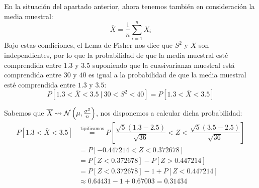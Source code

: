 \begin{ejercicio}
\begin{enumerate}[label=\alph*)]
            En la situación del apartado anterior, ahora tenemos también en consideración la media muestral:
            \begin{equation*}
                \overline{X} = \dfrac{1}{n}\sum_{i=1}^n X_i
            \end{equation*} 
            Bajo estas condiciones, el Lema de Fisher nos dice que $S^2$ y $\overline{X}$ son independientes, por lo que la probabilidad de que la media muestral esté comprendida entre $1.3$ y $3.5$ suponiendo que la cuasivarianza muestral está comprendida entre $30$ y $40$ es igual a la probabilidad de que la media muestral esté comprendida entre $1.3$ y $3.5$:
            \begin{equation*}
                P[1.3<\overline{X}<3.5\ |\ 30 < S^2 < 40] = P[1.3<\overline{X}<3.5]
            \end{equation*}

            Sabemos que $\overline{X}\rightsquigarrow\mathcal{N}\left(\mu, \frac{\sigma^2}{n}\right)$, nos disponemos a calcular dicha probabilidad:
            \begin{align*}
                P[1.3<\overline{X}<3.5] &\stackrel{\text{tipificamos}}{=} P\left[\dfrac{\sqrt{5}(1.3-2.5)}{\sqrt{36}}< Z < \dfrac{\sqrt{5}(3.5-2.5)}{\sqrt{36}}\right] \\
                                        &= P[-0.447214 < Z < 0.372678] \\ 
                                        &= P[Z<0.372678] - P[Z>0.447214] \\
                                        &= P[Z<0.372678] -1 + P[Z<0.447214] \\
                                        &\approx 0.64431 - 1 + 0.67003 = 0.31434
            \end{align*}
    \end{enumerate}
\end{ejercicio}

